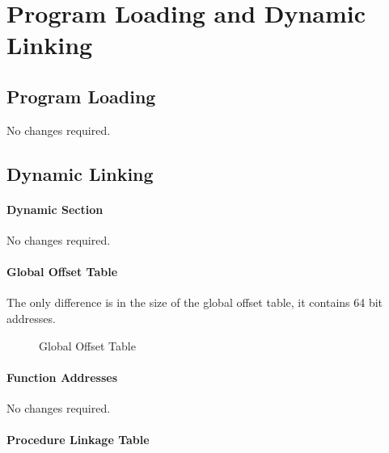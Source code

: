 \chapter{Program Loading and Dynamic Linking}

\section{Program Loading}

No changes required.


\section{Dynamic Linking}

\subsubsection{Dynamic Section}

No changes required.

\subsubsection{Global Offset Table}

The only difference is in the size of the global offset table, it
contains 64 bit addresses.

\begin{figure}[H]
\caption{Global Offset Table}
\begin{center}
\end{center}
\end{figure}

\subsubsection{Function Addresses}

No changes required.

\subsubsection{Procedure Linkage Table}



